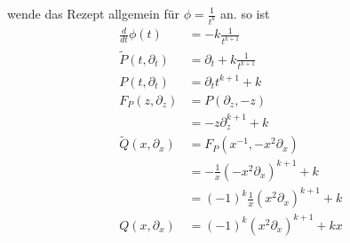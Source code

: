 \begin{comment}
warum sind diese wichtig??
\end{comment}

wende das Rezept allgemein für $\phi=\frac{1}{t^k}$ an.
so ist 
\begin{align*}
\frac{d}{dt}\phi(t)    &=-k\frac{1}{t^{k+1}}\\
\tilde P(t,\partial_t) &=\partial_t+k\frac{1}{t^{k+1}} \\
P(t,\partial_t)        &=\partial_tt^{k+1}+k \\
F_P(z,\partial_z)      &=P(\partial_z,-z)\\
                       &=-z\partial_z^{k+1}+k\\
\tilde Q(x,\partial_x) &=F_P(x^{-1},-x^2\partial_x) \\
                       &=-\frac{1}{x}(-x^2\partial_x)^{k+1}+k\\
                       &=(-1)^{k}\frac{1}{x}(x^2\partial_x)^{k+1}+k\\
Q(x,\partial_x)        &=(-1)^{k}(x^2\partial_x)^{k+1}+kx
\end{align*}

